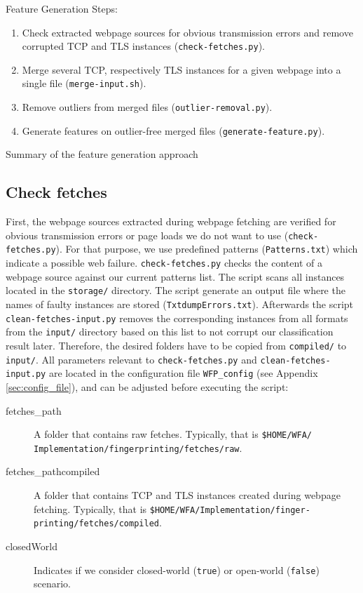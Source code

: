 \begin{listing}[t]
Feature Generation Steps:
\begin{enumerate}
    \item Check extracted webpage sources for obvious transmission errors and remove corrupted \ac{TCP} and \ac{TLS} instances (\texttt{check-fetches.py}).
    \item Merge several \ac{TCP}, respectively \ac{TLS} instances for a given webpage into a single file (\texttt{merge-input.sh}).
    \item Remove outliers from merged files (\texttt{outlier-removal.py}).
    \item Generate features on outlier-free merged files (\texttt{generate-feature.py}).
\end{enumerate}
\caption{Summary of the feature generation approach}
\label{lst:generate_features}
\end{listing}

\subsection{Check fetches}
First, the webpage sources extracted during webpage fetching are verified for obvious transmission errors or page loads we do not want to use (\texttt{check-fetches.py}). For that purpose, we use predefined patterns (\texttt{Patterns.txt}) which indicate a possible web failure. \texttt{check-fetches.py} checks the content of a webpage source against our current patterns list. The script scans all instances located in the \texttt{storage/} directory.  The script generate an output file where the names of faulty instances are stored (\texttt{TxtdumpErrors.txt}). Afterwards the script \texttt{clean-fetches-input.py} removes the corresponding instances from all formats from the \texttt{input/} directory based on this list to not corrupt our classification result later. Therefore, the desired folders have to be copied from \texttt{compiled/} to \texttt{input/}. All parameters relevant to \texttt{check-fetches.py} and \texttt{clean-fetches-input.py} are located in the configuration file \texttt{WFP\_config} (see Appendix \ref{sec:config_file}), and can be adjusted before executing the script: 


\begin{description}
\item [fetches\_path] A folder that contains raw fetches. Typically, that is \texttt{\$HOME/WFA/ Implementation/fingerprinting/fetches/raw}.
\item [fetches\_pathcompiled] A folder that contains \ac{TCP} and \ac{TLS} instances created during webpage fetching. Typically, that is \texttt{\$HOME/WFA/Implementation/finger- printing/fetches/compiled}.
\item [closedWorld] Indicates if we consider closed-world (\texttt{true}) or open-world (\texttt{false}) scenario. 
\end{description}


